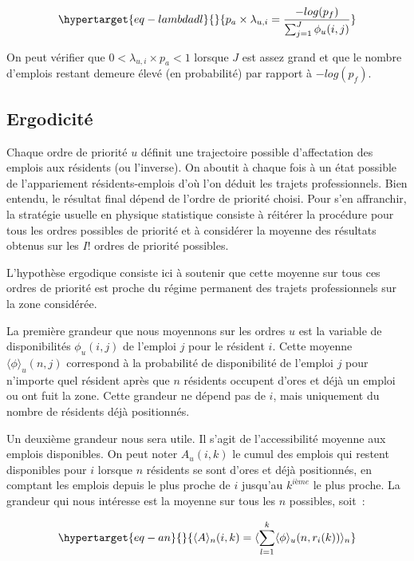 \documentclass[
  10pt,
  a4paper,
  numbers=noendperiod,
  DIV=9]{scrreprt}
\begin{document}
\begin{equation}\protect\hypertarget{eq-lambdadl}{}{
p_{a} \times \lambda_{u,i} = \frac {-log(p_f)}{\sum_{j=1} ^{J} \phi_u(i,j)}
}\label{eq-lambdadl}\end{equation}

On peut vérifier que \(0<\lambda_{u,i}\times p_a<1\) lorsque \(J\) est
assez grand et que le nombre d'emplois restant demeure élevé (en
probabilité) par rapport à \(-log(p_f)\).

\hypertarget{sec-erg}{%
\subsection{Ergodicité}\label{sec-erg}}

Chaque ordre de priorité \(u\) définit une trajectoire possible
d'affectation des emplois aux résidents (ou l'inverse). On aboutit à
chaque fois à un état possible de l'appariement résidents-emplois d'où
l'on déduit les trajets professionnels. Bien entendu, le résultat final
dépend de l'ordre de priorité choisi. Pour s'en affranchir, la stratégie
usuelle en physique statistique consiste à réitérer la procédure pour
tous les ordres possibles de priorité et à considérer la moyenne des
résultats obtenus sur les \(I!\) ordres de priorité possibles.

L'hypothèse ergodique consiste ici à soutenir que cette moyenne sur tous
ces ordres de priorité est proche du régime permanent des trajets
professionnels sur la zone considérée.

La première grandeur que nous moyennons sur les ordres \(u\) est la
variable de disponibilités \(\phi_u(i,j)\) de l'emploi \(j\) pour le
résident \(i\). Cette moyenne \(\langle\phi\rangle_u(n,j)\) correspond à
la probabilité de disponibilité de l'emploi \(j\) pour n'importe quel
résident après que \(n\) résidents occupent d'ores et déjà un emploi ou
ont fuit la zone. Cette grandeur ne dépend pas de \(i\), mais uniquement
du nombre de résidents déjà positionnés.

Un deuxième grandeur nous sera utile. Il s'agit de l'accessibilité
moyenne aux emplois disponibles. On peut noter \(A_u(i,k)\) le cumul des
emplois qui restent disponibles pour \(i\) lorsque \(n\) résidents se
sont d'ores et déjà positionnés, en comptant les emplois depuis le plus
proche de \(i\) jusqu'au \(k^{ième}\) le plus proche. La grandeur qui
nous intéresse est la moyenne sur tous les \(n\) possibles, soit~:

\begin{equation}\protect\hypertarget{eq-an}{}{
\langle A \rangle_n(i,k) = \langle\sum_{l=1}^k \langle \phi \rangle_u(n, r_i(k)) \rangle _n
}\label{eq-an}\end{equation}
\end{document}
